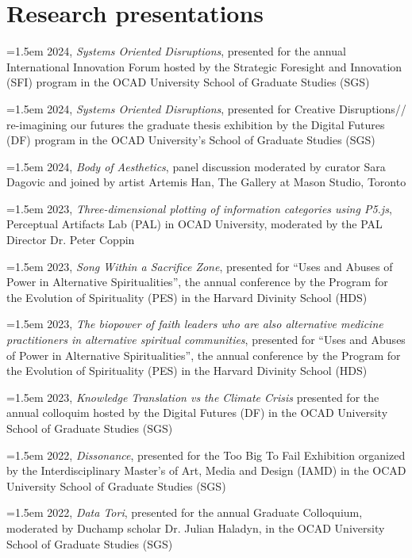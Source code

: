 \section{Research presentations}

\noindent\hangindent=1.5em  2024, \textit{Systems Oriented Disruptions}, presented for the annual International Innovation Forum hosted by the Strategic Foresight and Innovation (SFI) program in the OCAD University School of Graduate Studies (SGS)
 
\noindent\hangindent=1.5em 2024, \textit{Systems Oriented Disruptions}, presented for Creative Disruptions// re-imagining our futures the graduate thesis exhibition by the Digital Futures (DF) program in the OCAD University’s School of Graduate Studies (SGS)

\noindent\hangindent=1.5em 2024, \textit{Body of Aesthetics}, panel discussion moderated by curator Sara Dagovic and joined by artist Artemis Han, The Gallery at Mason Studio, Toronto

\noindent\hangindent=1.5em 2023, \textit{Three-dimensional plotting of information categories using P5.js}, Perceptual Artifacts Lab (PAL) in OCAD University, moderated by the PAL Director Dr. Peter Coppin  

\noindent\hangindent=1.5em 2023, \textit{Song Within a Sacrifice Zone}, presented for “Uses and Abuses of Power in Alternative Spiritualities”, the annual conference by the Program for the Evolution of Spirituality (PES) in the Harvard Divinity School (HDS)
 
\noindent\hangindent=1.5em 2023, \textit{The biopower of faith leaders who are also alternative medicine practitioners in alternative spiritual communities}, presented for “Uses and Abuses of Power in Alternative Spiritualities”, the annual conference by the Program for the Evolution of Spirituality (PES) in the Harvard Divinity School (HDS)
 
\noindent\hangindent=1.5em 2023, \textit{Knowledge Translation vs the Climate Crisis} presented for the annual colloquim hosted by the Digital Futures (DF) in the OCAD University School of Graduate Studies (SGS)
 
\noindent\hangindent=1.5em 2022, \textit{Dissonance}, presented for the Too Big To Fail Exhibition organized by the Interdisciplinary Master’s of Art, Media and Design (IAMD) in the OCAD University School of Graduate Studies (SGS)

\noindent\hangindent=1.5em 2022, \textit{Data Tori}, presented for the annual Graduate Colloquium, moderated by Duchamp scholar Dr. Julian Haladyn, in the OCAD University School of Graduate Studies (SGS)
  
